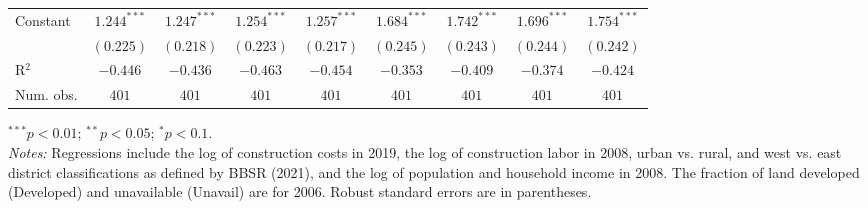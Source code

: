\begin{table}[H]
\begin{center}
\begin{footnotesize}
\begin{threeparttable}
\begin{tabular}{l@{} c@{} c@{} c@{} c@{} c@{} c@{} c@{} c@{}}
Constant                              & $1.244^{***}$ & $1.247^{***}$ & $1.254^{***}$ & $1.257^{***}$ & $1.684^{***}$ & $1.742^{***}$ & $1.696^{***}$ & $1.754^{***}$ \\
                                      & $(0.225)$     & $(0.218)$     & $(0.223)$     & $(0.217)$     & $(0.245)$     & $(0.243)$     & $(0.244)$     & $(0.242)$     \\
\midrule
R$^2$                                 & $-0.446$      & $-0.436$      & $-0.463$      & $-0.454$      & $-0.353$      & $-0.409$      & $-0.374$      & $-0.424$      \\
Num. obs.                             & $401$         & $401$         & $401$         & $401$         & $401$         & $401$         & $401$         & $401$         \\
\bottomrule
\end{tabular}
\begin{tablenotes}[flushleft]
\tiny{\item $^{***}p<0.01$; $^{**}p<0.05$; $^{*}p<0.1$. \\ \textit{Notes:} Regressions include the log of construction costs in 2019, the log of construction labor in 2008, urban vs. rural, and west vs. east district classifications as defined by BBSR (2021), and the log of population and household income in 2008. The fraction of land developed (Developed) and unavailable (Unavail) are for 2006. Robust standard errors are in parentheses.}
\end{tablenotes}
\end{threeparttable}
\end{footnotesize}
\label{tab:iv-results-single-family-checked}
\end{center}
\end{table}

